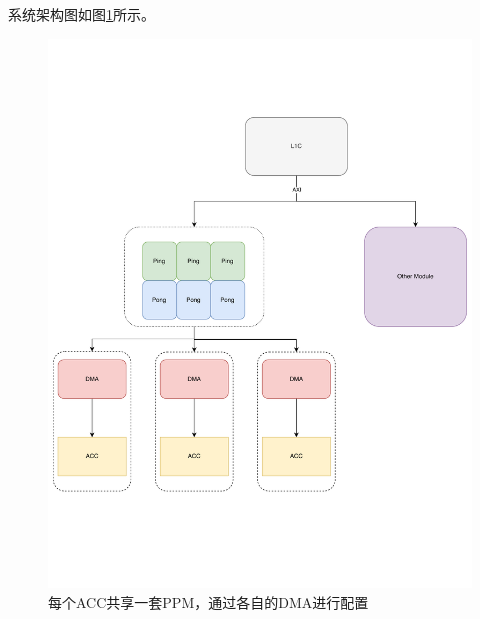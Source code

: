 \documentclass[a4paper, 12pt]{article}
\begin{document}
系统架构图如图\ref{fig:acc_dma}所示。
\begin{figure}
  \centering
  \includegraphics[width=\linewidth]{./images/acc_dma.pdf}
  \caption{每个ACC共享一套PPM，通过各自的DMA进行配置}
  \label{fig:acc_dma}
\end{figure}

\newpage 
\end{document}
